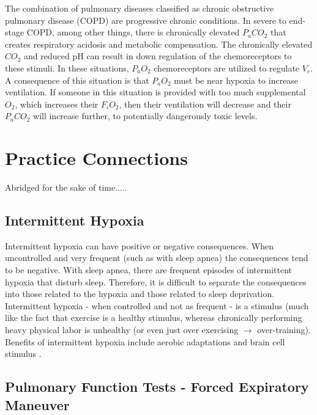 The combination of pulmonary diseases classified as chronic obstructive pulmonary disease (COPD) are progressive chronic conditions. In severe to end-stage COPD, among other things, there is chronically elevated $P_aCO_2$ that creates respiratory acidosis and metabolic compensation. The chronically elevated $CO_2$ and reduced pH can result in down regulation of the chemoreceptors to these stimuli. In these situations, $P_aO_2$ chemoreceptors are utilized to regulate $V_e$. A consequence of this situation is that $P_aO_2$ must be near hypoxia to increase ventilation. If someone in this situation is provided with too much supplemental $O_2$, which increases their $F_iO_2$, then their ventilation will decrease and their $P_aCO_2$ will increase further, to potentially dangerously toxic levels.

\section{Practice Connections}

Abridged for the sake of time.....

\subsection{Intermittent Hypoxia}

Intermittent hypoxia can have positive or negative consequences. When uncontrolled and very frequent (such as with sleep apnea) the consequences tend to be negative. With sleep apnea, there are frequent episodes of intermittent hypoxia that disturb sleep. Therefore, it is difficult to separate the consequences into those related to the hypoxia and those related to sleep deprivation.
Intermittent hypoxia - when controlled and not as frequent - is a stimulus (much like the fact that exercise is a healthy stimulus, whereas chronically performing heavy physical labor is unhealthy (or even just over exercising $\rightarrow$ over-training). Benefits of intermittent hypoxia include aerobic adaptations and brain cell stimulus \cite{navarrete-opazo_therapeutic_2014, verges_hypoxic_2015}.

\subsection{Pulmonary Function Tests - Forced Expiratory Maneuver}

